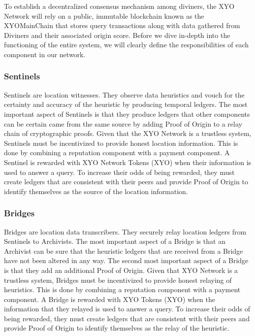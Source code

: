 \documentclass{article}
\begin{document}
To establish a decentralized consensus mechanism among diviners, the XYO Network will rely on a public, immutable blockchain known as the XYOMainChain that stores query transactions along with data gathered from Diviners and their associated origin score. Before we dive in-depth into the functioning of the entire system, we will clearly define the responsibilities of each component in our network.

\subsubsection{Sentinels}

Sentinels are location witnesses. They observe data heuristics and vouch for the certainty and accuracy of the heuristic by producing temporal ledgers. The most important aspect of Sentinels is that they produce ledgers that other components can be certain came from the same source by adding Proof of Origin to a relay chain of cryptographic proofs. Given that the XYO Network is a trustless system, Sentinels must be incentivized to provide honest location information. This is done by combining a reputation component with a payment component. A Sentinel is rewarded with XYO Network Tokens (XYO) when their information is used to answer a query. To increase their odds of being rewarded, they must create ledgers that are consistent with their peers and provide Proof of Origin to identify themselves as the source of the location information.

\subsubsection{Bridges}

Bridges are location data transcribers. They securely relay location ledgers from Sentinels to Archivists. The most important aspect of a Bridge is that an Archivist can be sure that the heuristic ledgers that are received from a Bridge have not been altered in any way. The second most important aspect of a Bridge is that they add an additional Proof of Origin. Given that XYO Network is a trustless system, Bridges must be incentivized to provide honest relaying of heuristics. This is done by combining a reputation component with a payment component. A Bridge is rewarded with XYO Tokens (XYO) when the information that they relayed is used to answer a query. To increase their odds of being rewarded, they must create ledgers that are consistent with their peers and provide Proof of Origin to identify themselves as the relay of the heuristic.
\end{document}
